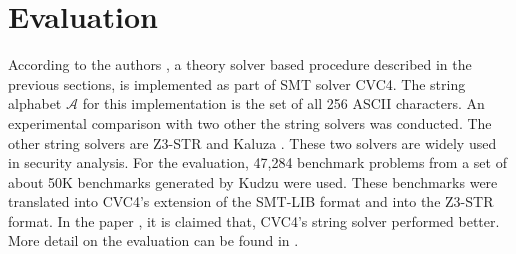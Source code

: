 \section{Evaluation}
\label{sec:evaluation}
According to the authors \cite{main-paper}, a theory solver based procedure described in the previous sections, is implemented as part of SMT solver CVC4. The string alphabet $\mathcal{A}$ for this implementation is the set of all 256 ASCII characters. An experimental comparison with two other the string solvers was conducted. The other string solvers are Z3-STR \cite{Z3_str} and Kaluza \cite{Kaluza}. These two solvers are widely used in security analysis. For the evaluation, 47,284 benchmark problems from a set of about 50K benchmarks generated by Kudzu \cite{Kudzu} were used. These benchmarks were translated into CVC4’s extension of the SMT-LIB format and into the Z3-STR format. In the paper \cite{main-paper}, it is claimed that, CVC4’s string solver performed better. More detail on the evaluation can be found in \cite{main_phd}.